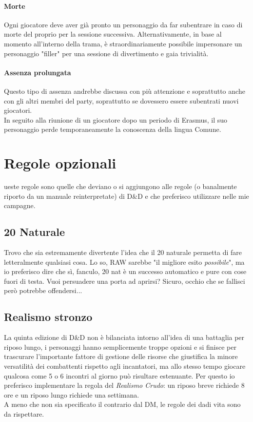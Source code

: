 \paragraph{Morte}

Ogni giocatore deve aver già pronto un personaggio da far subentrare in caso di morte del proprio per la sessione successiva. Alternativamente, in base al momento all'interno della trama, è straordinariamente possibile impersonare un personaggio "filler" per una sessione di divertimento e gaia trivialità.

\paragraph{Assenza prolungata}

Questo tipo di assenza andrebbe discussa con più attenzione e soprattutto anche con gli altri membri del party, soprattutto se dovessero essere subentrati nuovi giocatori. \\ In seguito alla riunione di un giocatore dopo un periodo di Erasmus, il suo personaggio perde temporaneamente la conoscenza della lingua Comune.

\section{Regole opzionali}

ueste regole sono quelle che deviano o si aggiungono alle regole (o banalmente riporto da un manuale reinterpretate) di D\&D e che preferisco utilizzare nelle mie campagne.

\subsection{20 Naturale}

Trovo che sia estremamente divertente l'idea che il 20 naturale permetta di fare letteralmente qualsiasi cosa. Lo so, RAW sarebbe "il migliore esito \textit{possibile}", ma io preferisco dire che sì, fanculo, 20 nat è un successo automatico e pure con cose fuori di testa. Vuoi persuadere una porta ad aprirsi? Sicuro, occhio che se fallisci però potrebbe offendersi...

\subsection{Realismo stronzo}

La quinta edizione di D\&D non è bilanciata intorno all'idea di una battaglia per riposo lungo, i personaggi hanno semplicemente troppe opzioni e si finisce per trascurare l'importante fattore di gestione delle risorse che giustifica la minore versatilità dei combattenti rispetto agli incantatori, ma allo stesso tempo giocare qualcosa come 5 o 6 incontri al giorno può risultare estenuante. Per questo io preferisco implementare la regola del \textit{Realismo Crudo}: un riposo breve richiede 8 ore e un riposo lungo richiede una settimana. \\ A meno che non sia specificato il contrario dal DM, le regole dei dadi vita sono da rispettare.

